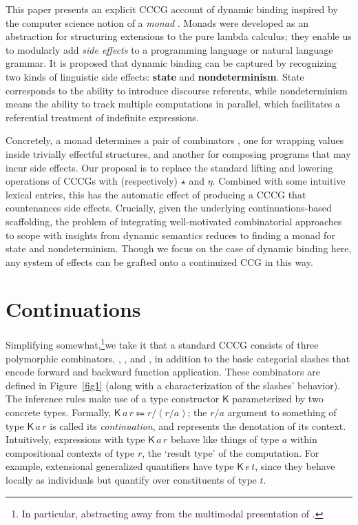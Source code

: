   This paper presents an explicit CCCG account of dynamic binding inspired by the computer science notion of a \emph{monad} \citep[e.g.][]{Moggi:1989, Wadler:1992, Wadler:1994, Wadler:1995, Shan:2002}. Monads were developed as an abstraction for structuring extensions to the pure lambda calculus; they enable us to modularly add \emph{side effects} \citep[cf.][]{Shan:2005} to a programming language or natural language grammar. It is proposed that dynamic binding can be captured by recognizing two kinds of linguistic side effects: \textbf{state} and \textbf{nondeterminism}. State corresponds to the ability to introduce discourse referents, while nondeterminism means the ability to track multiple computations in parallel, which facilitates a referential treatment of indefinite expressions. %
	
  Concretely, a monad determines a pair of combinators \ab{\eta,\,\star}, one for wrapping values inside trivially effectful structures, and another for composing programs that may incur side effects. Our proposal is to replace the standard lifting and lowering operations of CCCGs with (respectively) $\star$ and $\eta$. Combined with some intuitive lexical entries, this has the automatic effect of producing a CCCG that countenances side effects. Crucially, given the underlying continuations-based scaffolding, the problem of integrating well-motivated combinatorial approaches to scope with insights from dynamic semantics reduces to finding a monad for state and nondeterminism. Though we focus on the case of dynamic binding here, any system of effects can be grafted onto a continuized CCG in this way.%

\section{Continuations}
  Simplifying somewhat,\footnote{In particular, abstracting away from the multimodal presentation of \citealt{ShanBarker:2006, BarkerShan:2008, BarkerShan:2014}.}we take it that a standard CCCG consists of three polymorphic combinators, , , and , in addition to the basic categorial slashes that encode forward and backward function application. These combinators are defined in Figure~\ref{fig1} (along with a characterization of the slashes' behavior). The inference rules make use of a type constructor $\textsf{K}$ parameterized by two concrete types. Formally, $\textsf{K}\,a\,r \Coloneqq r/(r/a)$; the $r/a$ argument to something of type $\textsf{K}\,a\,r$ is called its \emph{continuation}, and represents the denotation of its context. Intuitively, expressions with type $\textsf{K}\,a\,r$ behave like things of type $a$ within compositional contexts of type $r$, the `result type' of the computation. For example, extensional generalized quantifiers have type $\textsf{K}\,e\,t$, since they behave locally as individuals but quantify over constituents of type $t$.%

